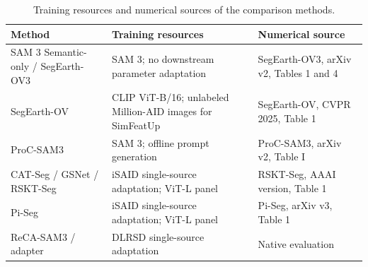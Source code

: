 \begin{table}[!t]
\centering
\caption{Training resources and numerical sources of the comparison methods.}
\label{tab:resource_settings}
\small
\setlength{\tabcolsep}{4pt}
\begin{tabular}{L{0.19\textwidth}L{0.34\textwidth}L{0.35\textwidth}}
\toprule
Method & Training resources & Numerical source\\
\midrule
SAM 3 Semantic-only / SegEarth-OV3 & SAM 3; no downstream parameter adaptation & SegEarth-OV3, arXiv v2, Tables 1 and 4\\
SegEarth-OV & CLIP ViT-B/16; unlabeled Million-AID images for SimFeatUp & SegEarth-OV, CVPR 2025, Table 1\\
ProC-SAM3 & SAM 3; offline prompt generation & ProC-SAM3, arXiv v2, Table I\\
CAT-Seg / GSNet / RSKT-Seg & iSAID single-source adaptation; ViT-L panel & RSKT-Seg, AAAI version, Table 1\\
Pi-Seg & iSAID single-source adaptation; ViT-L panel & Pi-Seg, arXiv v3, Table 1\\
ReCA-SAM3 / adapter & DLRSD single-source adaptation & Native evaluation\\
\bottomrule
\end{tabular}
\end{table}

